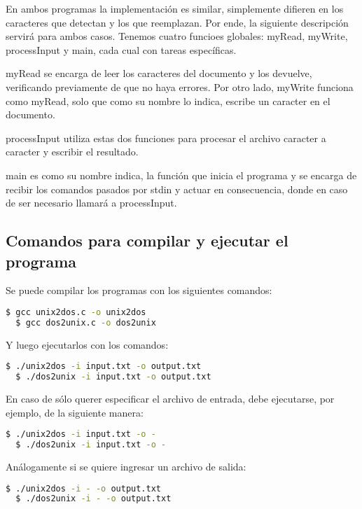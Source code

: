 \documentclass[a4paper]{article}
\begin{document}
En ambos programas la implementación es similar, simplemente difieren en los caracteres que detectan y los que reemplazan. Por ende, la siguiente descripción servirá para ambos casos. Tenemos cuatro funcioes globales: myRead, myWrite, processInput y main, cada cual con tareas específicas.


myRead se encarga de leer los caracteres del documento y los devuelve, verificando previamente de que no haya errores. Por otro lado, myWrite funciona como myRead, solo que como su nombre lo indica, escribe un caracter en el documento.

processInput utiliza estas dos funciones para procesar el archivo caracter a caracter y escribir el resultado.

main es como su nombre indica, la función que inicia el programa y se encarga de recibir los comandos pasados por stdin y actuar en consecuencia, donde en caso de ser necesario llamará a processInput.


\subsection{Comandos para compilar y ejecutar el programa}

Se puede compilar los programas con los siguientes comandos:

\begin{lstlisting}[language=bash]
  $ gcc unix2dos.c -o unix2dos
  $ gcc dos2unix.c -o dos2unix
\end{lstlisting}


Y luego ejecutarlos con los comandos:

\begin{lstlisting}[language=bash]
  $ ./unix2dos -i input.txt -o output.txt
  $ ./dos2unix -i input.txt -o output.txt
\end{lstlisting}

En caso de sólo querer especificar el archivo de entrada, debe ejecutarse, por ejemplo, de la siguiente manera:

\begin{lstlisting}[language=bash]
  $ ./unix2dos -i input.txt -o -
  $ ./dos2unix -i input.txt -o -
\end{lstlisting}

Análogamente si se quiere ingresar un archivo de salida:

\begin{lstlisting}[language=bash]
  $ ./unix2dos -i - -o output.txt
  $ ./dos2unix -i - -o output.txt
\end{lstlisting}
\end{document}
